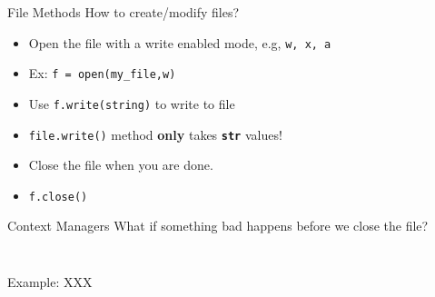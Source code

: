     \begin{frame}{File Methods}
        \LARGE
        How to create/modify files?
        \begin{itemize}
            \item Open the file with a write enabled mode, e.g, \texttt{w, x, a}
            \pause
            \item Ex: \texttt{f = open(\textquotesingle my\_file\textquotesingle ,\textquotesingle w\textquotesingle )}
            \pause
            \item Use \texttt{f.write(string)} to write to file
            \pause
            \item \texttt{file.write()} method \textbf{only} takes \texttt{\textbf{str}} values!
            \pause
            \item Close the file when you are done.
            \pause
            \item \texttt{f.close()}
        \end{itemize}
    \end{frame}

    \begin{frame}{Context Managers}
        \LARGE
        What if something bad happens before we close the file?
        \Large
        \inputminted[frame=single,framesep=2pt,firstline=1,lastline=6]{python3}{./code_examples/with_open.py}
        \inputminted[frame=single,framesep=2pt,firstline=8]{python3}{./code_examples/with_open.py}
    \end{frame}

    \begin{frame}{Example: XXX}
        
        
    
    \end{frame}

